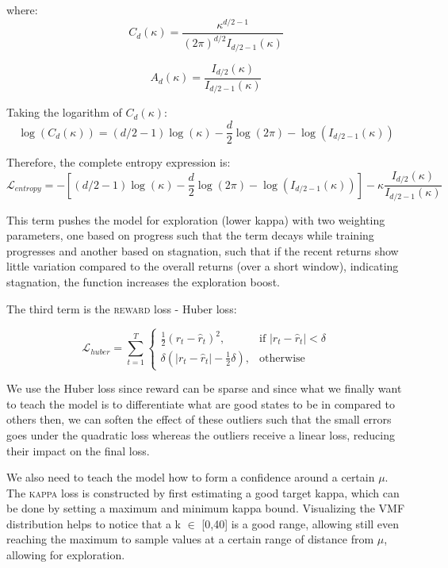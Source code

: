 where:
\begin{equation}
    C_d(\kappa) = \frac{\kappa^{d/2-1}}{(2\pi)^{d/2}I_{d/2-1}(\kappa)}
\end{equation}

\begin{equation}
    A_d(\kappa) = \frac{I_{d/2}(\kappa)}{I_{d/2-1}(\kappa)}
\end{equation}

Taking the logarithm of $C_d(\kappa)$:
\begin{equation}
    \log(C_d(\kappa)) = (d/2-1)\log(\kappa) - \frac{d}{2}\log(2\pi) - \log(I_{d/2-1}(\kappa))
\end{equation}

Therefore, the complete entropy expression is:
\begin{equation}
  \mathcal{L}_{entropy} = -\left[(d/2-1)\log(\kappa) - \frac{d}{2}\log(2\pi) - \log(I_{d/2-1}(\kappa))\right] - \kappa\frac{I_{d/2}(\kappa)}{I_{d/2-1}(\kappa)}
\end{equation}

This term pushes the model for exploration (lower kappa) with two weighting parameters, one based on progress such that the term decays while training progresses and another based on stagnation, such that if the recent returns show little variation compared to the overall returns (over a short window), indicating stagnation, the function increases the exploration boost.

The third term is the \textsc{reward} loss - Huber loss:

\begin{equation}
    \mathcal{L}_{huber} = \sum_{t=1}^{T} \begin{cases} 
    \frac{1}{2} \left( r_{t} - \hat{r}_{t} \right)^{2}, & \text{if } \left| r_{t} - \hat{r}_{t} \right| < \delta \\
    \delta \left( \left| r_{t} - \hat{r}_{t} \right| - \frac{1}{2} \delta \right), & \text{otherwise}
    \end{cases}
\end{equation}

We use the Huber loss since reward can be sparse and since what we finally want to teach the model is to differentiate what are good states to be in compared to others then, we can soften the effect of these outliers such that the small errors goes under the quadratic loss whereas the outliers receive a linear loss, reducing their impact on the final loss. 

We also need to teach the model how to form a confidence around a certain $\mu$. The \textsc{kappa} loss is constructed by first estimating a good target kappa, which can be done by setting a maximum and minimum kappa bound. Visualizing the VMF distribution helps to notice that a k $\in$ [0,40] is a good range, allowing still even reaching the maximum to sample values at a certain range of distance from $\mu$, allowing for exploration.%

